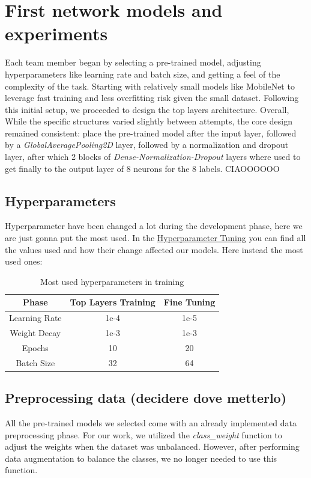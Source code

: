\documentclass[11pt]{article}
\begin{document}
\section{First network models and experiments}
Each team member began by selecting a pre-trained model, adjusting hyperparameters like learning rate and batch size, and getting a feel of the complexity of the task.
Starting with relatively small models like MobileNet to leverage fast training and less overfitting risk given the small dataset. 
Following this initial setup, we proceeded to design the top layers architecture. Overall, While the specific structures varied slightly between attempts, the core design remained consistent: place the pre-trained model after the input layer, followed by a \textit{GlobalAveragePooling2D} layer, followed by a normalization and dropout layer, after which 2 blocks of \textit{Dense-Normalization-Dropout} layers where used to get finally to the output layer of 8 neurons for the 8 labels.
CIAOOOOOO
\subsection{Hyperparameters}
Hyperparameter have been changed a lot during the development phase, here we are just gonna put the most used. In the \hyperref[hyperparametertuning]{Hyperparameter Tuning} you can find all the values used and how their change affected our models.
Here instead the most used ones:\\
\begin{table}[h!]
\centering
\begin{tabular}{|c|c|c|}
\hline
\textbf{Phase} & \textbf{Top Layers Training} & \textbf{Fine Tuning} \\ \hline
Learning Rate & 1e-4 & 1e-5 \\ \hline
Weight Decay & 1e-3 & 1e-3 \\ \hline
Epochs & 10 & 20 \\ \hline
Batch Size & 32 & 64 \\ \hline
\end{tabular}
\caption{Most used hyperparameters in training}
\end{table}
\subsection{Preprocessing data (decidere dove metterlo)}
All the pre-trained models we selected come with an already implemented data preprocessing phase. For our work, we utilized the \textit{class\_weight} function to adjust the weights when the dataset was unbalanced. However, after performing data augmentation to balance the classes, we no longer needed to use this function.
\end{document}
